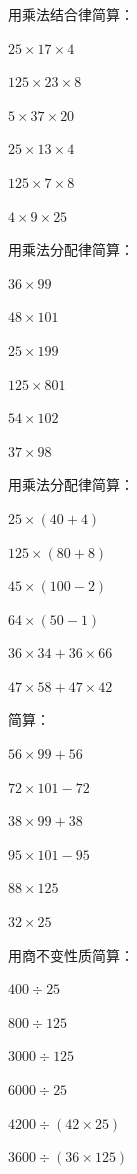 \documentclass[a4paper,12pt]{ctexart}
\begin{document}
\begin{exercise}
\item 用乘法结合律简算：
  \begin{subexercise}
    \item $25\times17\times4$
    \item $125\times23\times8$
    \item $5\times37\times20$
    \item $25\times13\times4$
    \item $125\times7\times8$
    \item $4\times9\times25$
  \end{subexercise}

\item 用乘法分配律简算：
  \begin{subexercise}
    \item $36\times99$
    \item $48\times101$
    \item $25\times199$
    \item $125\times801$
    \item $54\times102$
    \item $37\times98$
  \end{subexercise}

\item 用乘法分配律简算：
  \begin{subexercise}
    \item $25\times(40+4)$
    \item $125\times(80+8)$
    \item $45\times(100-2)$
    \item $64\times(50-1)$
    \item $36\times34+36\times66$
    \item $47\times58+47\times42$
  \end{subexercise}

\item 简算：
  \begin{subexercise}
    \item $56\times99+56$
    \item $72\times101-72$
    \item $38\times99+38$
    \item $95\times101-95$
    \item $88\times125$
    \item $32\times25$
  \end{subexercise}

\item 用商不变性质简算：
  \begin{subexercise}
    \item $400\div25$
    \item $800\div125$
    \item $3000\div125$
    \item $6000\div25$
    \item $4200\div(42\times25)$
    \item $3600\div(36\times125)$
  \end{subexercise}


\end{exercise}
\end{document}
